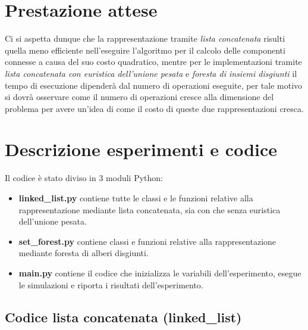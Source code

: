 \documentclass[12pt]{article}
\begin{document}
\section{Prestazione attese}
Ci si aspetta dunque che la rappresentazione tramite \textit{lista concatenata} risulti quella meno efficiente nell'eseguire l'algoritmo per il calcolo delle componenti connesse a causa del suo costo quadratico, mentre per le implementazioni tramite \textit{lista concatenata con euristica dell'unione pesata} e \textit{foresta di insiemi disgiunti} il tempo di esecuzione dipenderà dal numero di operazioni eseguite, per tale motivo si dovrà osservare come il numero di operazioni cresce alla dimensione del problema per avere un'idea di come il costo di queste due rappresentazioni cresca.

\section{Descrizione esperimenti e codice}

Il codice è stato diviso in 3 moduli Python:
\begin{itemize}
    \item \textbf{linked\_list.py} contiene tutte le classi e le funzioni relative alla rappresentazione mediante lista concatenata, sia con che senza euristica dell'unione pesata.
    \item \textbf{set\_forest.py} contiene classi e funzioni relative alla rappresentazione mediante foresta di alberi disgiunti.
    \item \textbf{main.py} contiene il codice che inizializza le variabili dell'esperimento, esegue le simulazioni e riporta i risultati dell'esperimento.
\end{itemize}

\subsection{Codice lista concatenata (linked\_list)}
\end{document}
